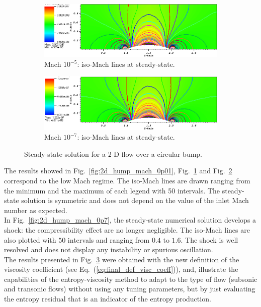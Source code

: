 \documentclass[preprint,10pt]{elsarticle}
\newcommand{\eqt}[1]{Eq.~(\ref{#1})}                     %
\newcommand{\fig}[1]{Fig.~\ref{#1}}                      %
\begin{document}
\begin{figure}[H]
        \begin{subfigure}[b]{0.495\textwidth}
                \centering
                \includegraphics[width=\textwidth]{Hump2D_mach_1em4.png}
                \caption{Mach $10^{-5}$: iso-Mach lines at steady-state.}
                \label{fig:2d_hump_mach_0p0001}
        \end{subfigure}
        \begin{subfigure}[b]{0.495\textwidth}
                \centering
                \includegraphics[width=\textwidth]{Hump2D_mach_1em7.png}
                \caption{Mach $10^{-7}$: iso-Mach lines at steady-state.}
                \label{fig:2d_hump_mach_0p0000001}
        \end{subfigure}
        \caption{Steady-state solution for a 2-D flow over a circular bump.}\label{fig:2d_hump}
\end{figure}
%
The results showed in \fig{fig:2d_hump_mach_0p01}, \fig{fig:2d_hump_mach_0p0001} and \fig{fig:2d_hump_mach_0p0000001} correspond to the low Mach regime. The iso-Mach lines are drawn ranging from the minimum and the maximum of each legend with 50 intervals. The steady-state solution is symmetric and does not depend on the value of the inlet Mach number as expected. \\
In \fig{fig:2d_hump_mach_0p7}, the steady-state numerical solution develops a shock: the compressibility effect are no longer negligible. The iso-Mach lines are also plotted with $50$ intervals and ranging from $0.4$ to $1.6$. The shock is well resolved and does not display any instability or spurious oscillation. \\
The results presented in \fig{fig:2d_hump} were obtained with the new definition of the viscosity coefficient (see \eqt{eq:final_def_visc_coeff}), and, illustrate the capabilities of the entropy-viscosity method to adapt to the type of flow (subsonic and transonic flows) without using any tuning parameters, but by just evaluating the entropy residual that is an indicator of the entropy production.    
\end{document}
